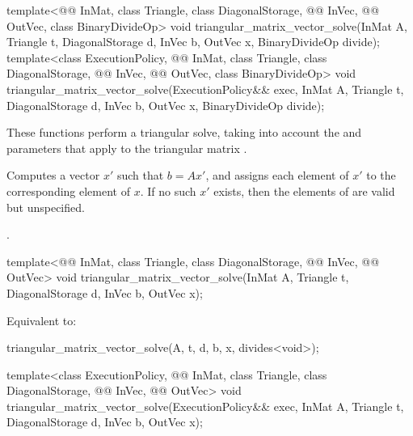 %
\begin{itemdecl}
  template<@@ InMat, class Triangle, class DiagonalStorage,
           @@ InVec, @@ OutVec, class BinaryDivideOp>
    void triangular_matrix_vector_solve(InMat A, Triangle t, DiagonalStorage d,
                                        InVec b, OutVec x, BinaryDivideOp divide);
  template<class ExecutionPolicy, @@ InMat, class Triangle, class DiagonalStorage,
           @@ InVec, @@ OutVec, class BinaryDivideOp>
    void triangular_matrix_vector_solve(ExecutionPolicy&& exec,
                                        InMat A, Triangle t, DiagonalStorage d,
                                        InVec b, OutVec x, BinaryDivideOp divide);
\end{itemdecl}

\begin{itemdescr}

\pnum
These functions perform
a triangular solve,
taking into account the  and  parameters
that apply to the triangular matrix .

\pnum
\effects
Computes a vector $x'$ such that $b = A x'$,
and assigns each element of $x'$ to the corresponding element of $x$.
If no such $x'$ exists,
then the elements of  are valid but unspecified.

\pnum
\complexity
{}.
\end{itemdescr}

%
\begin{itemdecl}
template<@@ InMat, class Triangle, class DiagonalStorage,
         @@ InVec, @@ OutVec>
  void triangular_matrix_vector_solve(InMat A, Triangle t, DiagonalStorage d, InVec b, OutVec x);
\end{itemdecl}

\begin{itemdescr}
\pnum
\effects
Equivalent to:
\begin{codeblock}
triangular_matrix_vector_solve(A, t, d, b, x, divides<void>{});
\end{codeblock}
\end{itemdescr}

%
\begin{itemdecl}
template<class ExecutionPolicy, @@ InMat, class Triangle, class DiagonalStorage,
         @@ InVec, @@ OutVec>
  void triangular_matrix_vector_solve(ExecutionPolicy&& exec,
                                      InMat A, Triangle t, DiagonalStorage d, InVec b, OutVec x);
\end{itemdecl}

